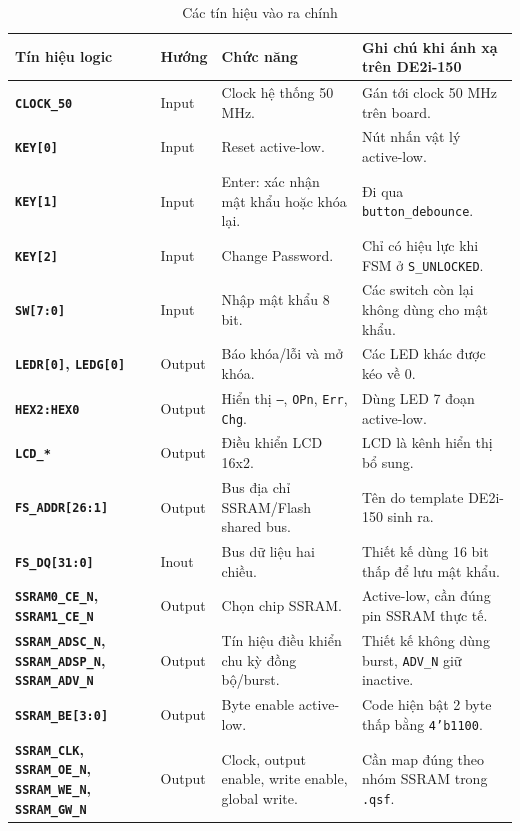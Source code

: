 \documentclass[13pt,a4paper]{article}
\begin{document}
\begin{table}[H]
\centering
\caption{Các tín hiệu vào ra chính}
\label{tab:io}
\small
\begin{tabularx}{\textwidth}{|>{\bfseries}p{3.4cm}|p{1.7cm}|X|X|}
\hline
\textbf{Tín hiệu logic} & \textbf{Hướng} & \textbf{Chức năng} & \textbf{Ghi chú khi ánh xạ trên DE2i-150}\\
\hline
\texttt{CLOCK\_50} & Input & Clock hệ thống 50 MHz. & Gán tới clock 50 MHz trên board.\\
\hline
\texttt{KEY[0]} & Input & Reset active-low. & Nút nhấn vật lý active-low.\\
\hline
\texttt{KEY[1]} & Input & Enter: xác nhận mật khẩu hoặc khóa lại. & Đi qua \texttt{button\_debounce}.\\
\hline
\texttt{KEY[2]} & Input & Change Password. & Chỉ có hiệu lực khi FSM ở \texttt{S\_UNLOCKED}.\\
\hline
\texttt{SW[7:0]} & Input & Nhập mật khẩu 8 bit. & Các switch còn lại không dùng cho mật khẩu.\\
\hline
\texttt{LEDR[0]}, \texttt{LEDG[0]} & Output & Báo khóa/lỗi và mở khóa. & Các LED khác được kéo về 0.\\
\hline
\texttt{HEX2:HEX0} & Output & Hiển thị \texttt{---}, \texttt{OPn}, \texttt{Err}, \texttt{Chg}. & Dùng LED 7 đoạn active-low.\\
\hline
\texttt{LCD\_*} & Output & Điều khiển LCD 16x2. & LCD là kênh hiển thị bổ sung.\\
\hline
\texttt{FS\_ADDR[26:1]} & Output & Bus địa chỉ SSRAM/Flash shared bus. & Tên do template DE2i-150 sinh ra.\\
\hline
\texttt{FS\_DQ[31:0]} & Inout & Bus dữ liệu hai chiều. & Thiết kế dùng 16 bit thấp để lưu mật khẩu.\\
\hline
\texttt{SSRAM0\_CE\_N}, \texttt{SSRAM1\_CE\_N} & Output & Chọn chip SSRAM. & Active-low, cần đúng pin SSRAM thực tế.\\
\hline
\texttt{SSRAM\_ADSC\_N}, \texttt{SSRAM\_ADSP\_N}, \texttt{SSRAM\_ADV\_N} & Output & Tín hiệu điều khiển chu kỳ đồng bộ/burst. & Thiết kế không dùng burst, \texttt{ADV\_N} giữ inactive.\\
\hline
\texttt{SSRAM\_BE[3:0]} & Output & Byte enable active-low. & Code hiện bật 2 byte thấp bằng \texttt{4'b1100}.\\
\hline
\texttt{SSRAM\_CLK}, \texttt{SSRAM\_OE\_N}, \texttt{SSRAM\_WE\_N}, \texttt{SSRAM\_GW\_N} & Output & Clock, output enable, write enable, global write. & Cần map đúng theo nhóm SSRAM trong \texttt{.qsf}.\\
\hline
\end{tabularx}
\end{table}
\normalsize
\end{document}
